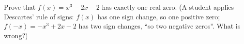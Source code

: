 Prove that $f(x)=x^3-2x-2$ has exactly one real zero. (A student applies Descartes' rule of signs: $f(x)$ has one sign change, so one positive zero; $f(-x)=-x^3+2x-2$ has two sign changes, ``so two negative zeros''. What is wrong?)
